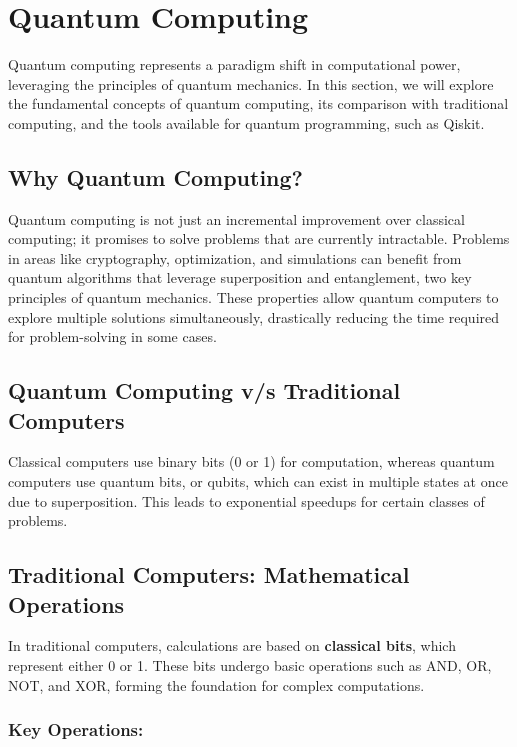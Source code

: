\documentclass[12pt,a4paper]{article}
\begin{document}
\section{Quantum Computing}

Quantum computing represents a paradigm shift in computational power, leveraging the principles of quantum mechanics. In this section, we will explore the fundamental concepts of quantum computing, its comparison with traditional computing, and the tools available for quantum programming, such as Qiskit.

\subsection{Why Quantum Computing?}
Quantum computing is not just an incremental improvement over classical computing; it promises to solve problems that are currently intractable. Problems in areas like cryptography, optimization, and simulations can benefit from quantum algorithms that leverage superposition and entanglement, two key principles of quantum mechanics. These properties allow quantum computers to explore multiple solutions simultaneously, drastically reducing the time required for problem-solving in some cases.

\subsection{Quantum Computing v/s Traditional Computers}
Classical computers use binary bits (0 or 1) for computation, whereas quantum computers use quantum bits, or qubits, which can exist in multiple states at once due to superposition. This leads to exponential speedups for certain classes of problems.

\subsection{Traditional Computers: Mathematical Operations}

In traditional computers, calculations are based on \textbf{classical bits}, which represent either 0 or 1. These bits undergo basic operations such as AND, OR, NOT, and XOR, forming the foundation for complex computations.

\subsubsection{Key Operations:}
\end{document}
